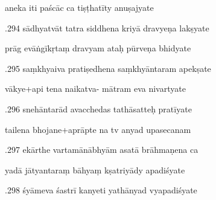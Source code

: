 \documentclass[article,12pt,a4paper]{memoir}%
\newcounter{parCount}
\begin{document}
	  
	  \pstart \leavevmode%
	aneka iti paścāc ca tiṣṭhatīty anuṣajyate 
	{}
	\pend%
      

	  
	  \pstart {}.294 sādhyatvāt tatra siddhena kriyā dravyeṇa lakṣyate 
	{}
	\pend%
      

	  
	  \pstart \leavevmode%
	prāg evāṅgīkṛtaṃ dravyam ataḥ pūrveṇa bhidyate 
	{}
	\pend%
      

	  
	  \pstart {}.295 saṃkhyaiva pratiṣedhena saṃkhyāntaram apekṣate 
	{}
	\pend%
      

	  
	  \pstart \leavevmode%
	vākye+api tena naikatva- mātram eva nivartyate 
	{}
	\pend%
      

	  
	  \pstart {}.296 snehāntarād avacchedas tathāsatteḥ pratīyate 
	{}
	\pend%
      

	  
	  \pstart \leavevmode%
	tailena bhojane+aprāpte na tv anyad upasecanam 
	{}
	\pend%
      

	  
	  \pstart {}.297 ekārthe vartamānābhyām asatā brāhmaṇena ca 
	{}
	\pend%
      

	  
	  \pstart \leavevmode%
	yadā jātyantaraṃ bāhyaṃ kṣatriyādy apadiśyate 
	{}
	\pend%
      

	  
	  \pstart {}.298 śyāmeva śastrī kanyeti yathānyad vyapadiśyate 
	{}
	\pend%
      
\end{document}
